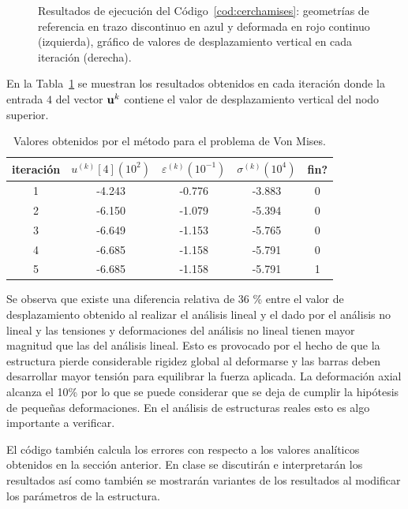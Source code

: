 \begin{figure}[htb]
	\centering
	\resizebox{.49\linewidth}{!}{}
	\resizebox{.49\linewidth}{!}{}
	\caption{Resultados de ejecución del Código~\ref{cod:cerchamises}: geometrías de referencia en trazo discontinuo en azul y deformada en rojo continuo (izquierda), gráfico de valores de desplazamiento vertical en cada iteración (derecha).}
	\label{fig:defmises}
\end{figure}

En la Tabla~\ref{tab:resmises} se muestran los resultados obtenidos en cada iteración donde la entrada $4$ del vector ${\bf u}^k$ contiene el valor de desplazamiento vertical del nodo superior.
%
\begin{table}[htb]
	\centering
	\begin{tabular}{ccccc}
		\hline
		iteración &    $u^{(k)}[4](10^{2})$  &$\varepsilon^{(k)} (10^{-1})$&  $\sigma^{(k)} (10^4)$ & fin? \\ 
		\hline   
		\hline
		1 &   -4.243 &   -0.776 &   -3.883 & 0 \\ 
		2 &   -6.150 &   -1.079 &   -5.394 & 0 \\ 
		3 &   -6.649 &   -1.153 &   -5.765 & 0 \\ 
		4 &   -6.685 &   -1.158 &   -5.791 & 0 \\ 
		5 &   -6.685 &   -1.158 &   -5.791 & 1 \\ 
		\hline
	\end{tabular}
	\caption{Valores obtenidos por el método para el problema de Von Mises.}
	\label{tab:resmises}
\end{table}


Se observa que existe una diferencia relativa de 36 \% entre el valor de desplazamiento obtenido al realizar el análisis lineal y el dado por el análisis no lineal y las tensiones y deformaciones del análisis no lineal tienen mayor magnitud que las del análisis lineal. %
%
Esto es provocado por el hecho de que la estructura pierde considerable rigidez global al deformarse y las barras deben desarrollar mayor tensión para equilibrar la fuerza aplicada. %
%
La deformación axial alcanza el 10\% por lo que se puede considerar que se deja de cumplir la hipótesis de pequeñas deformaciones. %
%
En el análisis de estructuras reales esto es algo importante a verificar.

El código también calcula los errores con respecto a los valores analíticos obtenidos en la sección anterior. En clase se discutirán e interpretarán los resultados así como también se mostrarán variantes de los resultados al modificar los parámetros de la estructura.

